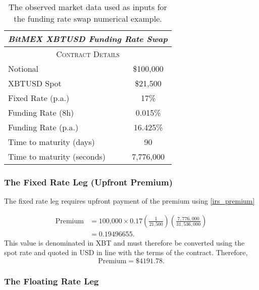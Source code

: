 \begin{table}[ht]
\begin{center}
\begin{tabular}{lc}

\toprule
\multicolumn{2}{c}{\textit{BitMEX XBTUSD Funding Rate Swap}} \\
\toprule
\multicolumn{2}{c}{\textsc{Contract Details}} \\
\toprule

Notional & \$100,000 \\
XBTUSD Spot & \$21,500 \\
Fixed Rate (p.a.) & 17\% \\
Funding Rate (8h) & 0.015\% \\
Funding Rate (p.a.) & 16.425\% \\
Time to maturity (days) & 90 \\
Time to maturity (seconds) & 7,776,000 \\
\toprule

\end{tabular}
\end{center}
\caption[BitMEX XBTUSD Perpetual Funding Rate Swap––Contract Details]{The observed market data used as inputs for the funding rate swap numerical example.}
\label{tab:xbtusd_irs}
\end{table}

\subsubsection{The Fixed Rate Leg (Upfront Premium)}

The fixed rate leg requires upfront payment of the premium using \ref{irs_premium}

\begin{align}
    \text{Premium} &= \text{100,000} \times 0.17 \left( \frac{1}{\text{21,500}} \right) \left( \frac{7,776,000}{31,536,000} \right) \\
    &= 0.19496655.
\end{align}
This value is denominated in XBT and must therefore be converted using the spot rate and quoted in USD in line with the terms of the contract. Therefore,
\begin{equation}
    \text{Premium} = \$4191.78.
\end{equation}

\subsubsection{The Floating Rate Leg}

